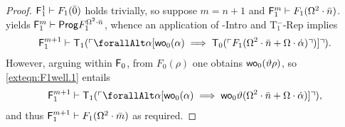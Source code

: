 \documentclass[UKenglish,cleveref,DIV=12]{scrartcl}
\let\forall\forallAlt
\theoremstyle{definition}
\theoremstyle{definition}
\begin{document}
\begin{proof}
$\mathsf{F}_1^1\vdash F_1(\bar 0)$ holds trivially, so suppose $m=n+1$ and $\mathsf{F}_1^m\vdash F_1(\Omega^2\cdot\bar n)$.
 yields $\mathsf{F}_1^m\vdash \mathsf{Prog}  F_1^{\Omega^2\cdot\bar n}$, whence an application of -Intro and T$^-_1$-Rep implies
\begin{align}\label{exteqn:F1well.1}
  \F_1^{m+1}\proves \T_1(\gn{\forall\alpha[\wo_0(\alpha)\implies \T_0(\gn{F_1(\Omega^2\cdot\bar n+\Omega\cdot\dot\alpha)})]}).
\end{align}
However, arguing within $\mathsf{F}_0$, from $F_0(\rho)$ one obtains $\mathsf{wo}_0(\vartheta\rho)$, so \cref{exteqn:F1well.1} entails
\begin{align*}
  \F_1^{m+1}\proves \T_1(\gn{\forall\alpha[\wo_0(\alpha)\implies \wo_0\vartheta(\Omega^2\cdot\bar n+\Omega\cdot \dot\alpha)]}),
\end{align*}
and thus $\mathsf{F}_1^{m+1}\vdash F_1(\Omega^2\cdot\bar m)$ as required.
\end{proof}
\end{document}
